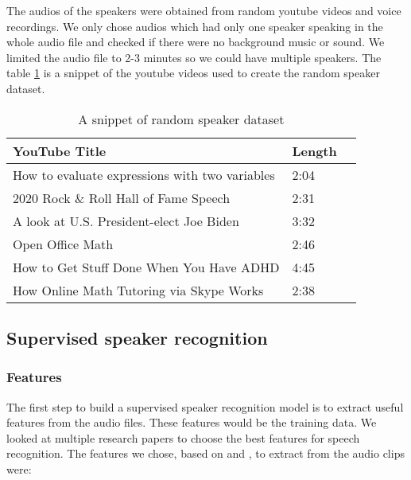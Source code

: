\documentclass[10pt,twocolumn,letterpaper]{article}
\begin{document}
The audios of the speakers were obtained from random youtube videos and voice recordings. We only chose audios which had only one speaker speaking in the whole audio file and checked if there were no background music or sound. We limited the audio file to 2-3 minutes so we could have multiple speakers. The table \ref{tab:random-speaker-dataset} is a snippet of the youtube videos used to create the random speaker dataset.



\begin{table}[h]
        \begin{tabular}{|l|l|l|}
        \hline
        \textbf{YouTube Title}                                       & \textbf{Length} \\ \hline
        How to evaluate expressions with two variables               & 2:04                         \\ \hline
        2020 Rock \& Roll Hall of Fame Speech                        & 2:31                         \\ \hline
        A look at U.S. President-elect Joe Biden                     & 3:32                         \\ \hline
        Open Office Math                                             & 2:46                         \\ \hline
        How to Get Stuff Done When You Have ADHD                     & 4:45                         \\ \hline
        How Online Math Tutoring via Skype Works                     & 2:38                         \\ \hline
        \end{tabular}
        \caption{A snippet of random speaker dataset}
        \label{tab:random-speaker-dataset}
\end{table}
 


\subsection{Supervised speaker recognition}

\subsubsection{Features}

The first step to build a supervised speaker recognition model is to extract useful features from the audio files. These features would be the training data. We looked at multiple research papers to choose the best features for speech recognition. The features we chose, based on \cite{Sharma} and \cite{Author}, to extract from the audio clips were:
\end{document}
